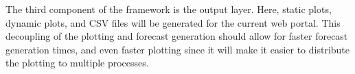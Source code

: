 The third component of the framework is the output layer.
Here, static plots, dynamic plots, and CSV files will be generated for
the current web portal.
This decoupling of the plotting and forecast generation should allow
for faster forecast generation times, and even faster plotting since
it will make it easier to distribute the plotting to multiple
processes.





